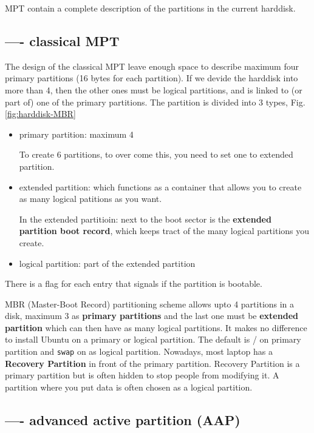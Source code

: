 MPT contain a complete description of the partitions in the current harddisk.

\subsection{---- classical MPT}

The design of the classical MPT leave enough space to describe maximum four
primary partitions (16 bytes for each partition). If we devide the harddisk into
more than 4, then the other ones must be logical partitions, and is linked to
(or part of) one of the primary partitions.
The partition is divided into 3 types, Fig.\ref{fig:harddisk-MBR}
\begin{itemize}
  \item primary partition: maximum 4
  
  To create 6 partitions, to over come this, you need to set one to extended
  partition.
  
  \item extended partition: which functions as a container that allows you to
  create as many logical patitions as you want.
  
  In the extended partitioin: next to the boot sector is the {\bf extended
  partition boot record}, which keeps tract of the many logical partitions you
  create.
  
  \item logical partition: part of the extended partition 
\end{itemize}

There is a flag for each entry that signals if the partition is bootable.

MBR (Master-Boot Record) partitioning scheme allows upto 4 partitions in a disk,
maximum 3 as {\bf primary partitions} and the last one must be {\bf
extended partition} which can then have as many logical partitions. It makes no
difference to install Ubuntu on a primary or logical partition. The default is /
on primary partition and \verb!swap! on as logical partition. Nowadays, most
laptop has a {\bf Recovery Partition} in front of the primary partition.
Recovery Partition is a primary partition but is often hidden to stop people
from modifying it. A partition where you put data is often chosen as a logical
partition.

\subsection{---- advanced active partition (AAP)}


